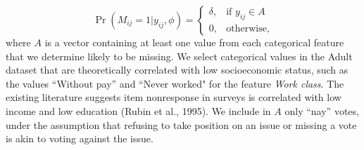 \documentclass[10pt]{book}
\theoremstyle{definition}
\begin{document}
 \begin{equation}\label{3.1}
\Pr (M_{ij} = 1 | y_{ij}, \phi) = \begin{cases}
\delta, &\text{if $y_{ij} \in A$}  \\
0, &\text{otherwise},
\end{cases}
\end{equation} where $A$ is a vector containing at least one value from each categorical feature that we determine likely to be missing. We select categorical values in the Adult dataset that are theoretically correlated with low socioeconomic status, such as the values ``Without pay'' and ``Never worked" for the feature \emph{Work class}. The existing literature suggests item nonresponse in surveys is correlated with low income and low education (Rubin et al., 1995). We include in $A$ only ``nay'' votes, under the assumption that refusing to take position on an issue or missing a vote is akin to voting against the issue. 
\end{document}
